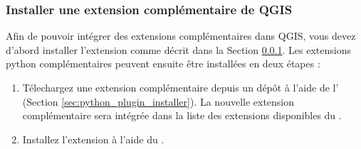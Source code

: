 

\subsubsection{Installer une extension compl\'ementaire de QGIS}\label{sec:load_external_plugin} 

Afin de pouvoir int\'egrer des extensions compl\'ementaires dans QGIS, vous devez d'abord installer l'extension  comme d\'ecrit dans la Section \ref{sec:load_external_plugin}.
Les extensions python compl\'ementaires peuvent ensuite \^etre install\'ees en deux \'etapes :

\begin{enumerate}
\item T\'elechargez une extension compl\'ementaire depuis un d\'ep\^ot \`a l'aide de l' (Section \ref{sec:python_plugin_installer}).
La nouvelle extension compl\'ementaire sera int\'egr\'ee dans la liste des extensions disponibles du .
\item Installez l'extension \`a l'aide du .
\end{enumerate}



